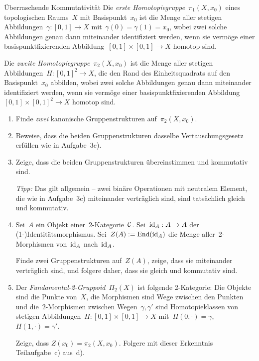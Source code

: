 \documentclass{uebblatt}
\begin{document}
\begin{aufgabe}{Überraschende Kommutativität}
Die \emph{erste Homotopiegruppe}~$\pi_1(X,x_0)$ eines topologischen Raums~$X$
mit Basispunkt~$x_0$ ist die Menge aller stetigen Abbildungen~$\gamma : [0,1]
\to X$ mit~$\gamma(0) = \gamma(1) = x_0$, wobei zwei solche Abbildungen genau
dann miteinander identifiziert werden, wenn sie vermöge einer
basispunktfixierenden Abbildung~$[0,1] \times [0,1] \to X$ homotop sind.

Die \emph{zweite Homotopiegruppe}~$\pi_2(X,x_0)$ ist
die Menge aller stetigen Abbildungen~$H : [0,1]^2 \to X$, die den Rand des
Einheitsquadrats auf den Basispunkt~$x_0$ abbilden, wobei zwei solche
Abbildungen genau dann miteinander identifiziert werden,  wenn sie vermöge
einer basispunktfixierenden Abbildung~$[0,1] \times [0,1]^2 \to X$ homotop
sind.

\begin{enumerate}
\item Finde \emph{zwei} kanonische Gruppenstrukturen auf~$\pi_2(X,x_0)$.
\item Beweise, dass die beiden Gruppenstrukturen dasselbe Vertauschungsgesetz
erfüllen wie in Aufgabe~3c).
\item Zeige, dass die beiden Gruppenstrukturen übereinstimmen und kommutativ
sind.

\emph{Tipp:} Das gilt allgemein -- zwei binäre Operationen mit neutralem
Element, die wie in Aufgabe~3c) miteinander verträglich sind, sind tatsächlich
gleich und kommutativ.

\item Sei~$A$ ein Objekt einer~2-Kategorie~$\mathcal{C}$. Sei~$\mathrm{id}_A : A \to A$ der
(1-)Identitätsmorphismus. Sei~$Z(A) := \mathrm{End}(\mathrm{id}_A)$ die Menge
aller~2-Morphismen von~$\mathrm{id}_A$ nach~$\mathrm{id}_A$.

Finde zwei Gruppenstrukturen auf~$Z(A)$, zeige, dass sie miteinander
verträglich sind, und folgere daher, dass sie gleich und kommutativ sind.

\item Der \emph{Fundamental-2-Gruppoid}~$\Pi_2(X)$ ist folgende 2-Kategorie:
Die Objekte sind die Punkte von~$X$, die Morphismen sind Wege zwischen den
Punkten und die~$2$-Morphismen zwischen Wegen~$\gamma, \gamma'$ sind
Homotopieklassen von stetigen Abbildungen~$H : [0,1] \times [0,1] \to X$
mit~$H(0,\cdot) = \gamma$, $H(1,\cdot) = \gamma'$.

Zeige, dass $Z(x_0) = \pi_2(X,x_0)$. Folgere mit dieser Erkenntnis
Teilaufgabe~c) aus~d).
\end{enumerate}
\end{aufgabe}
\end{document}
